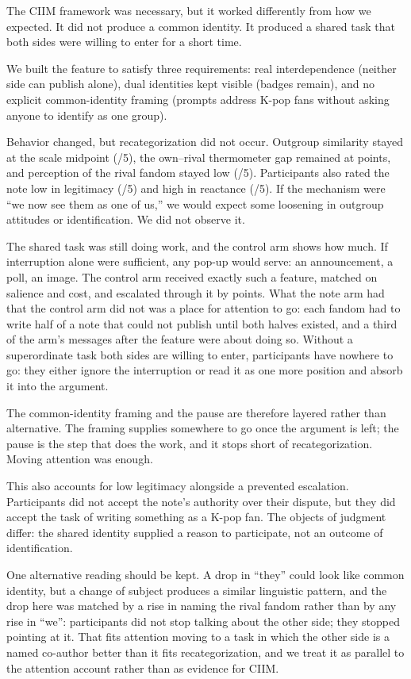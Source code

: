 \documentclass[manuscript,screen,review,anonymous]{acmart}
\begin{document}
The CIIM framework was necessary, but it worked differently from how we
expected. It did not produce a common identity. It produced a shared task
that both sides were willing to enter for a short time.

We built the feature to satisfy three requirements: real interdependence
(neither side can publish alone), dual identities kept visible (badges
remain), and no explicit common-identity framing (prompts address K-pop fans
without asking anyone to identify as one group).

Behavior changed, but recategorization did not occur. Outgroup similarity
stayed at the scale midpoint (\StatsimilM/5), the own--rival thermometer gap
remained at \StatthermGap{} points, and perception of the rival fandom stayed
low (\StatpercM/5). Participants also rated the note low in legitimacy
(\StatlegitM/5) and high in reactance (\StatreactM/5). If the mechanism were
``we now see them as one of us,'' we would expect some loosening in outgroup
attitudes or identification. We did not observe it.

The shared task was still doing work, and the control arm shows how much.
If interruption alone were sufficient, any pop-up would serve: an
announcement, a poll, an image. The control arm received exactly such a
feature, matched on salience and cost, and escalated through it by
\StatctrlChangeM{} points. What the note arm had that the control arm did
not was a place for attention to go: each fandom had to write half of a note
that could not publish until both halves existed, and a third of the arm's
messages after the feature were about doing so. Without a superordinate
task both sides are willing to enter, participants have nowhere to go: they
either ignore the interruption or read it as one more position and absorb
it into the argument.

The common-identity framing and the pause are therefore layered rather than
alternative. The framing supplies somewhere to go once the argument is left;
the pause is the step that does the work, and it stops short of
recategorization. Moving attention was enough.

This also accounts for low legitimacy alongside a prevented escalation.
Participants did not accept the note's authority over their dispute, but they
did accept the task of writing something as a K-pop fan. The objects of
judgment differ: the shared identity supplied a reason to participate, not an
outcome of identification.

One alternative reading should be kept. A drop in ``they'' could look like
common identity, but a change of subject produces a similar linguistic
pattern, and the drop here was matched by a rise in naming the rival fandom
rather than by any rise in ``we'': participants did not stop talking about
the other side; they stopped pointing at it. That fits attention moving to a
task in which the other side is a named co-author better than it fits
recategorization, and we treat it as parallel to the attention account rather
than as evidence for CIIM.
\end{document}
